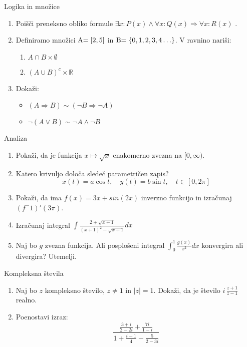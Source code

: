 \begin{frame}{Logika in množice}
	\begin{enumerate}
		\item
		Poišči preneksno obliko formule \(
\exists x \colon P(x) \land \forall x \colon Q(x) \Rightarrow \forall x \colon R(x)
\)
.
		\item 
		Definiramo množici \($A$ = \lbrack 2,5 \rbrack\) in \($B$ = \lbrace 0,1,2,3,4\ldots \rbrace\).
		V ravnino nariši:
		\begin{enumerate}
		   \item \(A \cap B \times \emptyset\)
		   \item \((A \cup B)^c \times \mathbb{R}\)
		\end{enumerate}
		\item
		Dokaži:
		\begin{itemize}
			\item \((A \Rightarrow B) \sim (\neg B \Rightarrow \neg A)\)
			\item \(\neg (A \lor B) \sim \neg A \land \neg B \)
		\end{itemize}
	\end{enumerate}
\end{frame}

\begin{frame}{Analiza}
	\begin{enumerate}
		\item
		Pokaži, da je funkcija \(x \mapsto \sqrt{x}\) enakomerno zvezna na \([0,\infty)\).
		\item 
		Katero krivuljo določa sledeč parametričen zapis?
		$$
		   x(t) = a \cos t, \quad  
		   y(t) = b \sin t, \quad 
		   t \in [0, 2 \pi]
		$$ 
		\item
		Pokaži, da ima \( f(x) = 3x + sin(2x) \) inverzno funkcijo in izračunaj \((f^-1)'(3\pi)\).
		
		\item
		Izračunaj integral 
		\(\int \frac{2+\sqrt{x+1}}{(x+1)^2-\sqrt{x+1}} dx\)
		\item 
		Naj bo $g$ zvezna funkcija. Ali posplošeni integral 
		\(\int_{0}^{1} \frac{g(x)}{x^2} dx\)
		konvergira ali divergira? Utemelji.
	\end{enumerate}
\end{frame}

\begin{frame}{Kompleksna števila}
	\begin{enumerate}
		\item
		Naj bo $z$ kompleksno število, $z \ne 1$ in $|z| = 1$.
		Dokaži, da je število \( i \, \frac{z+1}{z-1} \) realno.
		\item
		Poenostavi izraz:
		\[\frac{\frac{3 + i}{2 - 2i} + \frac{7i}{1 - i}}{1 + \frac{i - 1}{4} - \frac{5}{2 - 3i}}\]
	\end{enumerate}
\end{frame}